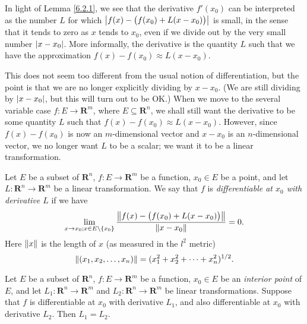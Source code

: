 \begin{note}
    In light of Lemma \ref{6.2.1}, we see that the derivative \(f'(x_0)\) can be interpreted as the number \(L\) for which \(\abs*{f(x) - \big(f(x_0) + L(x - x_0)\big)}\) is small, in the sense that it tends to zero as \(x\) tends to \(x_0\), even if we divide out by the very small number \(\abs*{x - x_0}\).
    More informally, the derivative is the quantity \(L\) such that we have the approximation \(f(x) - f(x_0) \approx L(x - x_0)\).

    This does not seem too different from the usual notion of differentiation, but the point is that we are no longer explicitly dividing by \(x - x_0\).
    (We are still dividing by \(\abs*{x - x_0}\), but this will turn out to be OK.)
    When we move to the several variable case \(f : E \to \mathbf{R}^m\), where \(E \subseteq \mathbf{R}^n\), we shall still want the derivative to be some quantity \(L\) such that \(f(x) - f(x_0) \approx L(x - x_0)\).
    However, since \(f(x) - f(x_0)\) is now an \(m\)-dimensional vector and \(x - x_0\) is an \(n\)-dimensional vector, we no longer want \(L\) to be a scalar;
    we want it to be a linear transformation.
\end{note}

\begin{definition}[Differentiability]\label{6.2.2}
    Let \(E\) be a subset of \(\mathbf{R}^n\), \(f : E \to \mathbf{R}^m\) be a function, \(x_0 \in E\) be a point, and let \(L : \mathbf{R}^n \to \mathbf{R}^m\) be a linear transformation.
    We say that \(f\) is \emph{differentiable at \(x_0\) with derivative \(L\)} if we have
    \[
        \lim_{x \to x_0 ; x \in E \setminus \{x_0\}} \frac{\norm*{f(x) - \big(f(x_0) + L(x - x_0)\big)}}{\norm*{x - x_0}} = 0.
    \]
    Here \(\norm*{x}\) is the length of \(x\) (as measured in the \(l^2\) metric)
    \[
        \norm*{(x_1, x_2, \dots, x_n)} = (x_1^2 + x_2^2 + \dots + x_n^2)^{1 / 2}.
    \]
\end{definition}

\setcounter{theorem}{3}
\begin{lemma}\label{6.2.4}
    Let \(E\) be a subset of \(\mathbf{R}^n\), \(f : E \to \mathbf{R}^m\) be a function, \(x_0 \in E\) be an \emph{interior point} of \(E\), and let \(L_1 : \mathbf{R}^n \to \mathbf{R}^m\) and \(L_2 : \mathbf{R}^n \to \mathbf{R}^m\) be linear transformations.
    Suppose that \(f\) is differentiable at \(x_0\) with derivative \(L_1\), and also differentiable at \(x_0\) with derivative \(L_2\).
    Then \(L_1 = L_2\).
\end{lemma}

